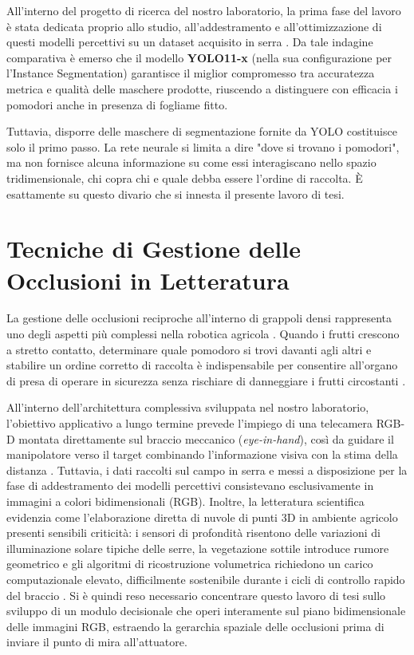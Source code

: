 All'interno del progetto di ricerca del nostro laboratorio, la prima fase del lavoro 
è stata dedicata proprio allo studio, all'addestramento e all'ottimizzazione di questi 
modelli percettivi su un dataset acquisito in serra \cite{collega_yolo}. Da tale indagine 
comparativa è emerso che il modello \textbf{YOLO11-x} (nella sua configurazione per 
l'Instance Segmentation) garantisce il miglior compromesso tra accuratezza metrica e 
qualità delle maschere prodotte, riuscendo a distinguere con efficacia i pomodori anche 
in presenza di fogliame fitto.

Tuttavia, disporre delle maschere di segmentazione fornite da YOLO costituisce solo il 
primo passo. La rete neurale si limita a dire "dove si trovano i pomodori", ma non fornisce 
alcuna informazione su come essi interagiscano nello spazio tridimensionale, chi copra chi 
e quale debba essere l'ordine di raccolta. È esattamente su questo divario che si innesta 
il presente lavoro di tesi.


\section{Tecniche di Gestione delle Occlusioni in Letteratura}
\label{sec:occlusioni_letteratura}

La gestione delle occlusioni reciproche all'interno di grappoli densi rappresenta 
uno degli aspetti più complessi nella robotica agricola \cite{bac2014harvesting}. 
Quando i frutti crescono a stretto contatto, determinare quale pomodoro si trovi 
davanti agli altri e stabilire un ordine corretto di raccolta è indispensabile per 
consentire all'organo di presa di operare in sicurezza senza rischiare di danneggiare 
i frutti circostanti \cite{silwal2017design}.

All'interno dell'architettura complessiva sviluppata nel nostro laboratorio, l'obiettivo 
applicativo a lungo termine prevede l'impiego di una telecamera RGB-D montata direttamente 
sul braccio meccanico (\textit{eye-in-hand}), così da guidare il manipolatore verso il target 
combinando l'informazione visiva con la stima della distanza \cite{collega_yolo}. 
Tuttavia, i dati raccolti sul campo in serra e messi a disposizione per la fase di addestramento 
dei modelli percettivi consistevano esclusivamente in immagini a colori bidimensionali (RGB). 
Inoltre, la letteratura scientifica evidenzia come l'elaborazione diretta di nuvole di punti 
3D in ambiente agricolo presenti sensibili criticità: i sensori di profondità risentono delle 
variazioni di illuminazione solare tipiche delle serre, la vegetazione sottile introduce 
rumore geometrico e gli algoritmi di ricostruzione volumetrica richiedono un carico computazionale 
elevato, difficilmente sostenibile durante i cicli di controllo rapido del braccio 
\cite{gongal2015sensors, bac2014harvesting}. Si è quindi reso necessario concentrare questo 
lavoro di tesi sullo sviluppo di un modulo decisionale che operi interamente sul piano 
bidimensionale delle immagini RGB, estraendo la gerarchia spaziale delle occlusioni prima 
di inviare il punto di mira all'attuatore.

